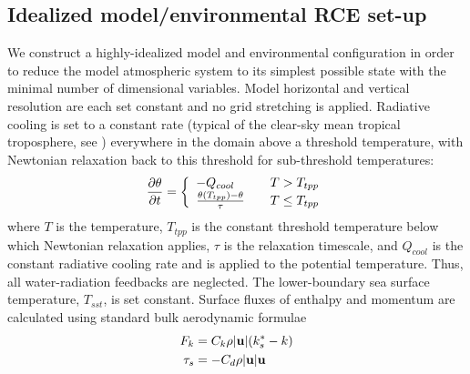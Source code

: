 \documentclass[12pt]{article}
\begin{document}
\subsection{Idealized model/environmental RCE set-up}
We construct a highly-idealized model and environmental configuration in order to reduce the model atmospheric system to its simplest possible state with the minimal number of dimensional variables. Model horizontal and vertical resolution are each set constant and no grid stretching is applied. Radiative cooling is set to a constant rate (typical of the clear-sky mean tropical troposphere, see \cite{Hartmann_Holton_Fu_2001}) everywhere in the domain above a threshold temperature, with Newtonian relaxation back to this threshold for sub-threshold temperatures:
\begin{equation}
\label{eq:radscheme}
\frac{\partial \theta}{\partial t} = \left\{ 
\begin{array}{l l}
  - Q_{cool} & \quad \mbox{$T > T_{tpp}$}\\
  \frac{\theta(T_{tpp})-\theta}{\tau} & \quad \mbox{$T \le T_{tpp}$}\\
  \end{array} \right.
\end{equation}
where $T$ is the temperature, $T_{tpp}$ is the constant threshold temperature below which Newtonian relaxation applies, $\tau$ is the relaxation timescale, and $Q_{cool}$ is the constant radiative cooling rate and is applied to the potential temperature. Thus, all water-radiation feedbacks are neglected. The lower-boundary sea surface temperature, $T_{sst}$, is set constant. Surface fluxes of enthalpy and momentum are calculated using standard bulk aerodynamic formulae
\begin{align}
	\label{eq:enthalpyflux}
	F_k &= C_k \rho |{\bf u}|(k^*_s-k) \\
	\label{eq:sfcstress}
	\tau_s &= -C_d \rho |{\bf u}|{\bf u}
\end{align}
\end{document}
